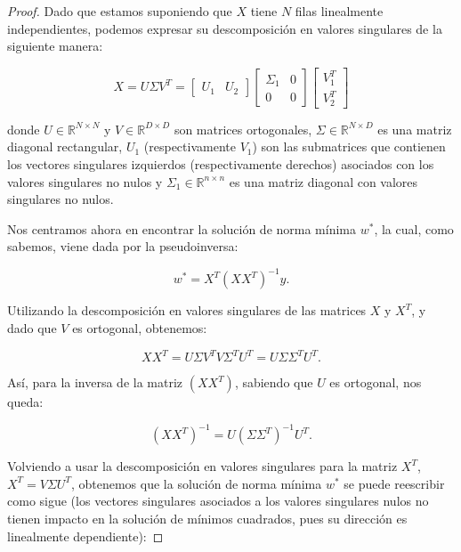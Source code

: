\begin{proof}
    Dado que estamos suponiendo que $X$ tiene $N$ filas linealmente independientes, podemos expresar su descomposición en valores singulares de la siguiente manera:

    \[
        X = U \Sigma V^T = \begin{bmatrix} U_1 & U_2 \end{bmatrix} \begin{bmatrix} \Sigma_1 & 0 \\ 0 & 0 \end{bmatrix} \begin{bmatrix} V_1^T \\ V_2^T \end{bmatrix}
    \]

    donde $U \in \mathbb{R}^{N \times N}$ y $V \in \mathbb{R}^{D \times D}$ son matrices ortogonales, $\Sigma \in \mathbb{R}^{N \times D}$ es una matriz diagonal rectangular, $U_1$ (respectivamente $V_1$) son las submatrices que contienen los vectores singulares izquierdos (respectivamente derechos) asociados con los valores singulares no nulos y $\Sigma_1 \in \mathbb{R}^{n \times n}$ es una matriz diagonal con valores singulares no nulos.\newline

    Nos centramos ahora en encontrar la solución de norma mínima $w^{*}$, la cual, como sabemos, viene dada por la pseudoinversa:

    \[
        w^* = X^T {(X X^T)}^{-1} y.
    \]\newline

    Utilizando la descomposición en valores singulares de las matrices $X$ y $X^{T}$, y dado que $V$ es ortogonal, obtenemos:

    \[
        X X^T = U \Sigma V^{T} V \Sigma^{T} U^{T} = U \Sigma \Sigma^{T} U^{T}.
    \]\newline

    Así, para la inversa de la matriz ${(X X^T)}$, sabiendo que $U$ es ortogonal, nos queda:

    \[
        {(X X^T)}^{-1} = U {(\Sigma \Sigma^{T})}^{-1} U^{T}.
    \]\newline

    Volviendo a usar la descomposición en valores singulares para la matriz $X^{T}$, $X^{T} = V \Sigma U^{T}$, obtenemos que la solución de norma mínima $w^{*}$ se puede reescribir como sigue (los vectores singulares asociados a los valores singulares nulos no tienen impacto en la solución de mínimos cuadrados, pues su dirección es linealmente dependiente):


\end{proof}
